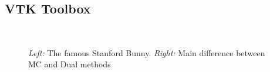 

\subsection{VTK Toolbox}
\begin{figure}
\centering
   \\
   \caption{\textit{Left:} The famous Stanford Bunny. \textit{Right:} Main difference between MC and Dual methods }
   \label{fig:bunny_MCDC}
\end{figure}

